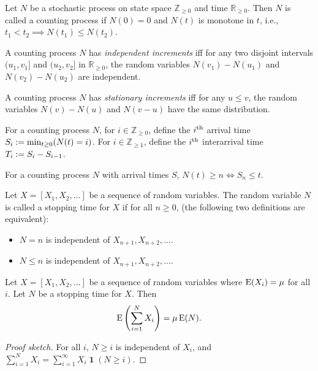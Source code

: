 \documentclass[a4paper, 12pt, fleqn]{article}
\DeclareMathOperator{\boolone}{\mathbf{1}}
\begin{document}
\begin{definition}
Let $N$ be a stochastic process on state space $\mathbb{Z}_{\ge 0}$ and time $\mathbb{R}_{\ge 0}$.
Then $N$ is called a counting process if $N(0) = 0$ and $N(t)$ is monotone in $t$,
i.e., $t_1 < t_2 \implies N(t_1) \le N(t_2)$.
\end{definition}

\begin{definition}
A counting process $N$ has \emph{independent increments} iff
for any two disjoint intervals $(u_1, v_1]$ and $(u_2, v_2]$ in $\mathbb{R}_{\ge 0}$,
the random variables $N(v_1) - N(u_1)$ and $N(v_2) - N(u_2)$ are independent.
\end{definition}

\begin{definition}
A counting process $N$ has \emph{stationary increments} iff for any $u \le v$,
the random variables $N(v) - N(u)$ and $N(v-u)$ have the same distribution.
\end{definition}

\begin{definition}
For a counting process $N$, for $i \in \mathbb{Z}_{\ge 0}$,
define the $i^{\textrm{th}}$ arrival time $S_i := \min_{t \ge 0} (N(t) = i)$.
For $i \in \mathbb{Z}_{\ge 1}$, define the $i^{\textrm{th}}$ interarrival time $T_i := S_i - S_{i-1}$.
\end{definition}

\begin{lemma}
For a counting process $N$ with arrival times $S$, $N(t) \ge n \iff S_n \le t$.
\end{lemma}

\begin{definition}
\label{defn:stopping-time}
Let $X = [X_1, X_2, \ldots]$ be a sequence of random variables.
The random variable $N$ is called a stopping time for $X$ if for all $n \ge 0$,
(the following two definitions are equivalent):
\begin{itemize}
\item $N = n$ is independent of $X_{n+1}, X_{n+2}, \ldots$.
\item $N \le n$ is independent of $X_{n+1}, X_{n+2}, \ldots$.
\end{itemize}
\end{definition}

\begin{theorem}
Let $X = [X_1, X_2, \ldots]$ be a sequence of random variables where $\operatorname*{E}(X_i) = \mu$ for all $i$.
Let $N$ be a stopping time for $X$. Then
\[ \operatorname*{E}\left(\sum_{i=1}^N X_i\right) = \mu\operatorname*{E}(N). \]
\end{theorem}
\begin{proof}[Proof sketch]
For all $i$, $N \ge i$ is independent of $X_i$, and
$\displaystyle \sum_{i=1}^N X_i = \sum_{i=1}^{\infty} X_i\boolone(N \ge i)$.
\end{proof}
\end{document}
